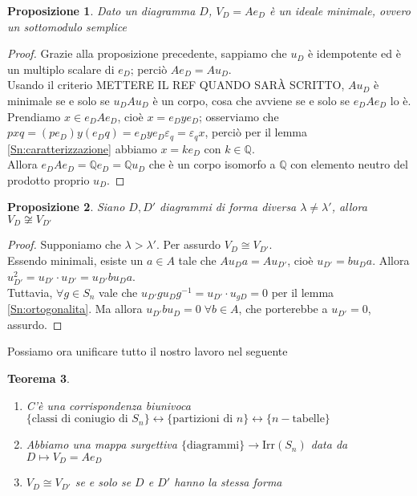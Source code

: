 \documentclass[11pt]{article}
\theoremstyle{plain}
\newtheorem{thm}{Teorema}[section]
\newtheorem{prop}[thm]{Proposizione}
\theoremstyle{definition}
\theoremstyle{remark}
\newcommand{\Q}{\mathbb{Q}}
\begin{document}
\begin{prop}
	Dato un diagramma $D$, $V_D=Ae_D$ è un ideale minimale, ovvero un sottomodulo semplice
\end{prop}
\begin{proof}
	Grazie alla proposizione precedente, sappiamo che $u_D$ è idempotente ed è un multiplo scalare di $e_D$; perciò $Ae_D=Au_D$.\\
	Usando il criterio METTERE IL REF QUANDO SARÀ SCRITTO, $Au_D$ è minimale se e solo se $u_DAu_D$ è un corpo, cosa che avviene se e solo se $e_DAe_D$ lo è.\\
	Prendiamo $x\in e_DAe_D$, cioè $x=e_Dye_D$; osserviamo che $pxq=(pe_D)y(e_Dq)=e_Dye_D\varepsilon_q=\varepsilon_q x$, perciò per il lemma \eqref{Sn:caratterizzazione} abbiamo $x=ke_D$ con $k\in\Q$.\\
	Allora $e_DAe_D=\Q e_D=\Q u_D$ che è un corpo isomorfo a $\Q$ con elemento neutro del prodotto proprio $u_D$.
\end{proof}
\begin{prop}
	Siano $D,D'$ diagrammi di forma diversa $\lambda\neq\lambda'$, allora $V_D\not\cong V_{D'}$
\end{prop}
\begin{proof}
	Supponiamo che $\lambda>\lambda'$. Per assurdo $V_D\cong V_{D'}$.\\
	Essendo minimali, esiste un $a\in A$ tale che $Au_Da=Au_{D'}$, cioè $u_{D'}=bu_{D}a$. Allora $u_{D'}^2=u_{D'}\cdot u_{D'}=u_{D'}bu_{D}a$.\\
	Tuttavia, $\forall g\in S_n$ vale che $u_{D'}gu_{D}g^{-1}=u_{D'}\cdot u_{gD}=0$ per il lemma \eqref{Sn:ortogonalita}. Ma allora $u_{D'}bu_{D}=0\;\forall b\in A$, che porterebbe a $u_{D'}=0$, assurdo.
\end{proof}
Possiamo ora unificare tutto il nostro lavoro nel seguente
\begin{thm}$ $
	\begin{enumerate}
		\item C'è una corrispondenza biunivoca $\{\text{classi di coniugio di }S_n\} \leftrightarrow \{\text{partizioni di }n\} \leftrightarrow \{n-\text{tabelle}\}$
		\item Abbiamo una mappa surgettiva $\{\text{diagrammi}\}\to\text{Irr}(S_n)$ data da $D\mapsto V_D=Ae_D$
		\item $V_D\cong V_{D'}$ se e solo se $D$ e $D'$ hanno la stessa forma
	\end{enumerate}
\end{thm}
\end{document}
